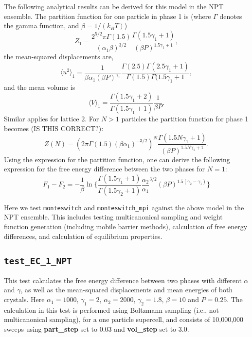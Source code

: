 \documentclass{report}
\begin{document}
The following analytical results can be derived for this model in the NPT ensemble.
The partition function for one particle in phase 1 is (where $\Gamma$ denotes the gamma function, and $\beta=1/(k_BT)$)
\begin{equation}
Z_1=\frac{2^{5/2}\pi\Gamma(1.5)}{(\alpha_1\beta)^{3/2}}\frac{\Gamma(1.5\gamma_1+1)}{(\beta P)^{1.5\gamma_1+1}},
\end{equation}
the mean-squared displacements are,
\begin{equation}
\langle u^2\rangle_1=\frac{1}{\beta\alpha_1(\beta P)^{\gamma_1}}\frac{\Gamma(2.5)\Gamma(2.5\gamma_1+1)}{\Gamma(1.5)\Gamma(1.5\gamma_1+1},
\end{equation}
and the mean volume is
\begin{equation}
\langle V\rangle_1=\frac{\Gamma(1.5\gamma_1+2)}{\Gamma(1.5\gamma_1+1)}\frac{1}{\beta P}.
\end{equation}
Similar applies for lattice 2.
For $N>1$ particles the partition function for phase 1 becomes (IS THIS CORRECT?):
\begin{equation}
Z(N)=(2\pi\Gamma(1.5)(\beta\alpha_1)^{-3/2})^N\frac{\Gamma(1.5N\gamma_1+1)}{(\beta P)^{1.5N\gamma_1+1}}.
\end{equation}
Using the expression for the partition function, one can derive the following expression for the free energy difference
between the two phases for $N=1$:
\begin{equation}
F_1-F_2=-\frac{1}{\beta}\ln\Biggl\lbrace 
\frac{\Gamma(1.5\gamma_1+1)}{\Gamma(1.5\gamma_2+1)}\frac{\alpha_2}{\alpha_1}^{3/2}(\beta P)^{1.5(\gamma_2-\gamma_1)}
\Biggr\rbrace
\end{equation}

Here we test \texttt{monteswitch} and \texttt{monteswitch\_mpi} against the above model in the
NPT ensemble. This includes testing multicanonical sampling and weight function generation (including
mobile barrier methods), calculation of free energy differences, and calculation of equilibrium properties.


\subsection{\texttt{test\_EC\_1\_NPT}}
This test calculates the free energy difference between two phases with different $\alpha$ and $\gamma$,
as well as the mean-squared displacements and mean energies of both crystals. Here $\alpha_1=1000$, $\gamma_1=2$,
$\alpha_2=2000$, $\gamma_2=1.8$, $\beta=10$ and $P=0.25$. The calculation in this test is performed using Boltzmann 
sampling (i.e., not multicanonical sampling), for a one particle supercell, and consists of 10,000,000 sweeps 
using \textbf{part\_step} set to 0.03 and \textbf{vol\_step} set to 3.0.
\end{document}
